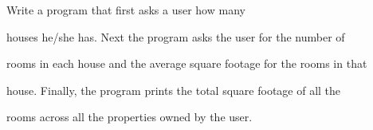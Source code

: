  Write a program that first asks a user how many

houses he/she has. Next the program asks the user for the number of

rooms in each house and the average square footage for the rooms in that

house. Finally, the program prints the total square footage of all the

rooms across all the properties owned by the user.

